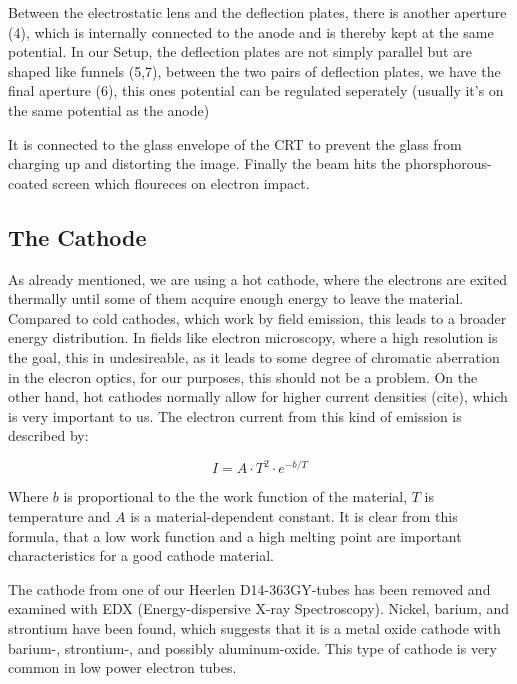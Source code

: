 Between the electrostatic lens and the deflection plates, there is another aperture (4), which is internally connected to the anode and is thereby kept at the same potential. In our Setup, the deflection plates are not simply parallel but are shaped like funnels (5,7), between the two pairs of deflection plates, we have the final aperture (6), this ones potential can be regulated seperately (usually it's on the same potential as the anode) 

It is connected to the glass envelope of the CRT to prevent the glass from charging up and distorting the image. 
Finally the beam hits the phorsphorous-coated screen which floureces on electron impact.

\subsection{The Cathode}

As already mentioned, we are using a hot cathode, where the electrons are exited thermally until some of them acquire enough energy to leave the material. Compared to cold cathodes, which work by field emission, this leads to a broader energy distribution. In fields like electron microscopy, where a high resolution is the goal, this in undesireable, as it leads to some degree of chromatic aberration in the elecron optics, for our purposes, this should not be a problem. On the other hand, hot cathodes normally allow for higher current densities  (cite), which is very important to us. The  electron current from this kind of emission is described by:\cite{PowerTubes323} 

\begin{equation}\label{eq:thermionic_current}
I=A\cdot T^2 \cdot e^{-b/T}
\end{equation}

Where $b$ is proportional to the the work function of the material, $T$ is temperature and $A$ is a material-dependent constant. It is clear from this formula, that a low work function and a high melting point are important characteristics for a good cathode material. 

The cathode from one of our Heerlen D14-363GY-tubes has been removed and examined with EDX (Energy-dispersive X-ray Spectroscopy). Nickel, barium, and strontium have been found, which suggests that it is a metal oxide cathode with barium-, strontium-, and possibly aluminum-oxide. This type of cathode is very common in low power electron tubes.


